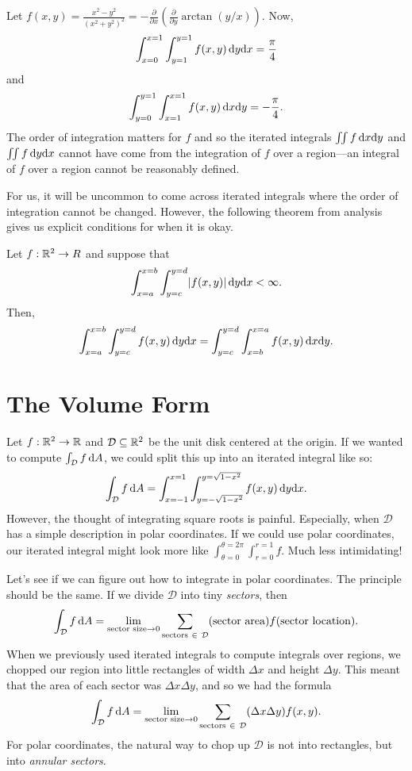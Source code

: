 \begin{example}
	Let $f(x,y)=\frac{x^2-y^2}{(x^2+y^2)^2} = 
	-\tfrac{\partial}{\partial x}\left(\tfrac{\partial}{\partial y}\arctan(y/x)\right)$.  Now,
	\[
		\int_{x=0}^{x=1}\int_{y=1}^{y=1} f(x,y)\,\mathrm{d} y\mathrm{d} x = \frac{\pi}{4}
	\]
	and
	\[
		\int_{y=0}^{y=1}\int_{x=1}^{x=1} f(x,y)\,\mathrm{d} x\mathrm{d} y = -\frac{\pi}{4}.
	\]
	The order of integration matters for $f$ and so the iterated integrals $\iint f\, \mathrm{d} x\mathrm{d} y$
	and $\iint f\,\mathrm{d} y\mathrm{d} x$ cannot have come from the integration of $f$ over a region---an
	integral of $f$ over a region cannot be reasonably defined.
\end{example}

For us, it will be uncommon to come across iterated integrals where the order of integration
cannot be changed.  However, the following theorem from analysis gives us explicit conditions
for when it is okay.

\begin{theorem}
	Let $f:\mathbb{R}^2\to R$ and suppose that 
	\[
		\int_{x=a}^{x=b}\int_{y=c}^{y=d} \lvert f(x,y)\rvert\,\mathrm{d} y\mathrm{d} x < \infty.
	\]
	Then,
	\[
		\int_{x=a}^{x=b}\int_{y=c}^{y=d} f(x,y)\,\mathrm{d} y\mathrm{d} x =
		\int_{y=c}^{y=d}\int_{x=b}^{x=a} f(x,y)\,\mathrm{d} x\mathrm{d} y.
	\]
\end{theorem}

\begin{exercises}
\end{exercises}

\section{The Volume Form}

Let $f:\mathbb{R}^2\to \mathbb{R}$ and $\mathcal D\subseteq \mathbb{R}^2$ be the unit disk centered at the origin.
If we wanted to compute $\int_{\mathcal D} f\,\mathrm{d} A$, we could split this up into an iterated
integral like so:
\[
	\int_{\mathcal D} f\,\mathrm{d} A = \int_{x=-1}^{x=1}\int_{y=-\sqrt{1-x^2}}^{y=\sqrt{1-x^2}} f(x,y)\,\mathrm{d} y\mathrm{d} x.
\]
However, the thought of integrating square roots is painful.  Especially, when $\mathcal D$ has
a simple description in polar coordinates.  If we could use polar coordinates, our iterated
integral might look more like $\int_{\theta=0}^{\theta=2\pi}\int_{r=0}^{r=1} f$.  Much less intimidating!

Let's see if we can figure out how to integrate in polar coordinates.  The principle should be the same.
If we divide $\mathcal D$ into tiny \emph{sectors}, then
\[
	\int_{\mathcal D} f\,\mathrm{d} A =\lim_{\text{sector size}\to 0} \sum_{\text{sectors}\ \in\ \mathcal D} (\text{sector
	area})f(\text{sector location}).
\]
When we previously used iterated integrals to compute integrals over regions, we chopped 
our region into little rectangles of width $\Delta x$ and height $\Delta y$.  This meant
that the area of each sector was $\Delta x\Delta y$, and so we had the formula
\[
	\int_{\mathcal D} f\,\d A =\lim_{\text{sector size}\to 0} \sum_{\text{sectors}\ \in\ \mathcal D} 
	(\Delta x\Delta y) f(x,y).
\]
For polar coordinates, 
the natural way to chop up $\mathcal D$ is not into rectangles, but
into \emph{annular sectors}.

